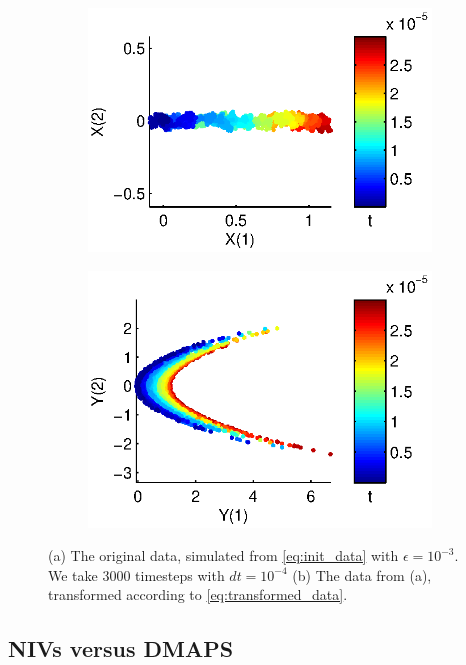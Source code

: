 \documentclass[1p]{elsarticle}
\begin{document}
\begin{figure}[h]
\begin{subfigure}{0.5\textwidth}
\includegraphics[width=\textwidth]{data_init}
\caption{}
\end{subfigure}
\begin{subfigure}{0.5\textwidth}
\includegraphics[width=\textwidth]{data_transformed}
\caption{}
\end{subfigure}
\caption{(a) The original data, simulated from \eqref{eq:init_data} with $\epsilon = 10^{-3}$. We take $3000$ timesteps with $dt = 10^{-4}$ (b) The data from (a), transformed according to \eqref{eq:transformed_data}. }
\label{fig:initial_data}
\end{figure}

\subsection{NIVs versus DMAPS}
\end{document}
